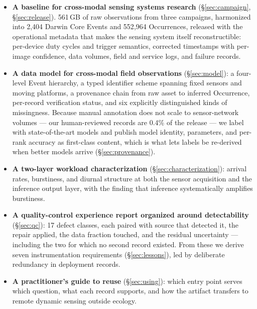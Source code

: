 \documentclass[sigconf]{acmart}
\begin{document}
\begin{itemize}
    \item \textbf{A baseline for cross-modal sensing systems research}
    (\S\ref{sec:campaign}, \S\ref{sec:release}). 561\,GB of raw
    observations from three campaigns, harmonized into 2{,}404 Darwin
    Core Events and 552{,}964 Occurrences, released with the operational
    metadata that makes the sensing system itself reconstructible:
    per-device duty cycles and trigger semantics, corrected timestamps
    with per-image confidence, data volumes, field and service logs, and
    failure records.

    \item \textbf{A data model for cross-modal field observations}
    (\S\ref{sec:model}): a four-level Event hierarchy, a typed
    identifier scheme spanning fixed sensors and moving platforms, a
    provenance chain from raw asset to inferred Occurrence, per-record
    verification status, and six explicitly distinguished kinds of
    missingness. Because manual annotation does not scale to
    sensor-network volumes --- our human-reviewed records are 0.4\% of
    the release --- we label with state-of-the-art models and publish
    model identity, parameters, and per-rank accuracy as first-class
    content, which is what lets labels be re-derived when better models
    arrive (\S\ref{sec:provenance}).

    \item \textbf{A two-layer workload characterization}
    (\S\ref{sec:characterization}): arrival rates, burstiness, and
    diurnal structure at both the sensor acquisition and the inference
    output layer, with the finding that inference systematically
    amplifies burstiness.

    \item \textbf{A quality-control experience report organized around
    detectability} (\S\ref{sec:qc}): 17 defect classes, each paired with
    source that detected it, the repair applied, the data
    fraction touched, and the residual uncertainty --- including the two
    for which no second record existed. From these we derive seven
    instrumentation requirements (\S\ref{sec:lessons}), led by
    deliberate redundancy in deployment records.

    \item \textbf{A practitioner's guide to reuse}
    (\S\ref{sec:using}): which entry point serves which question, what
    each record supports, and how the artifact transfers to remote
    dynamic sensing outside ecology.
\end{itemize}
\end{document}
